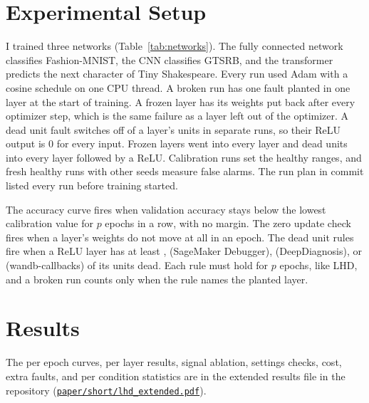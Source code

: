 \documentclass[11pt]{article}
\newcommand{\commitref}[1]{\href{https://github.com/sohan-bhat/lhd/commit/#1}{\texttt{#1}}}
\begin{document}
\section{Experimental Setup}
\label{sec:setup}

I trained three networks (Table~\ref{tab:networks}). The fully connected network classifies Fashion-MNIST, the CNN classifies GTSRB, and the transformer predicts the next character of Tiny Shakespeare. Every run used Adam with a cosine schedule on one CPU thread. A broken run has one fault planted in one layer at the start of training. A frozen layer has its weights put back after every optimizer step, which is the same failure as a layer left out of the optimizer. A dead unit fault switches off \lhdDeadFractions{} of a layer's units in separate runs, so their ReLU output is 0 for every input. Frozen layers went into every layer and dead units into every layer followed by a ReLU. Calibration runs set the healthy ranges, and fresh healthy runs with other seeds measure false alarms. The run plan in commit \commitref{\lhdPlanCommit} listed every run before training started.

The accuracy curve fires when validation accuracy stays below the lowest calibration value for $p$ epochs in a row, with no margin. The zero update check fires when a layer's weights do not move at all in an epoch. The dead unit rules fire when a ReLU layer has at least \lhdQuarterThreshold{}, \lhdSageThreshold{} (SageMaker Debugger), \lhdDeepThreshold{} (DeepDiagnosis), or \lhdWandbThreshold{} (wandb-callbacks) of its units dead. Each rule must hold for $p$ epochs, like LHD, and a broken run counts only when the rule names the planted layer.

\begin{table}[t]
\centering
\small
\caption{The three networks and their runs. Calibration runs set the ranges, fresh healthy runs measure false alarms, and the results use the runs with a frozen layer or dead units. The other faults are in the extended results.}
\label{tab:networks}

\end{table}

\section{Results}
\label{sec:results}

The per epoch curves, per layer results, signal ablation, settings checks, cost, extra faults, and per condition statistics are in the extended results file in the repository (\href{https://github.com/sohan-bhat/lhd/blob/main/paper/short/lhd_extended.pdf}{\texttt{paper/short/lhd\_extended.pdf}}).
\end{document}
